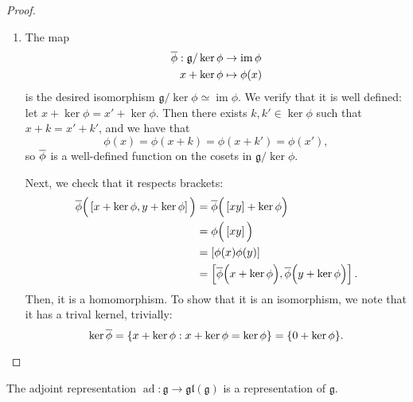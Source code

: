 \documentclass{article}
\newcommand{\lb}[1]{\ensuremath{\left[{#1}\right]}}
\DeclareMathOperator{\im}{im}
\DeclareMathOperator{\ad}{ad}
\newcommand{\frkg}{\ensuremath{\mathfrak{g}}}
\newcommand{\glalg}{\ensuremath{\mathfrak{gl}}}
\begin{document}
\begin{proof}
    \begin{enumerate}[label=(\alph*)]
        \item 
            The map
            \begin{align*}
                \barphi:
                \frkg/\ker\phi
                &\to
                \im \phi
                \\
                x + \ker \phi
                &\mapsto
                \phi(x)
            \end{align*}
            is the desired isomorphism $\frkg / \ker \phi \simeq \im \phi$.
            We verify that it is well defined: let $x + \ker \phi = x' + \ker \phi$.
            Then there exists $k, k' \in \ker \phi$ such that $x + k = x' + k'$, and we have that
            \[
                \phi(x)
                =
                \phi(x + k)
                =
                \phi(x + k')
                =
                \phi(x'),
            \]
            so $\overline{\phi}$ is a well-defined function on the cosets in $\frkg / \ker \phi$.

            Next, we check that it respects brackets:
            \begin{align*}
                \barphi
                \Big(
                    \lb{x+\ker\phi, y +\ker\phi}
                \Big)
                &=
                \barphi
                \Big(
                    \lb{xy} + \ker\phi
                \Big)
                \\
                &=
                \phi\Big(\lb{xy}\Big)
                \\
                &=
                \lb{\phi(x)\phi(y)}
                \\
                &=
                \lb{
                    \barphi\Big(x + \ker\phi\Big),
                    \barphi\Big(y + \ker\phi\Big)
                }.
            \end{align*}
            Then, it is a homomorphism.
            To show that it is an isomorphism, we note that it has a trival kernel, trivially:
            \[
                \ker\overline{\phi}
                =
                \{x + \ker \phi : x + \ker\phi = \ker \phi\}
                =
                \{0 + \ker \phi\}.
            \]
    \end{enumerate}
\end{proof}

\begin{theorem}
    The adjoint representation $\ad: \frkg \to \glalg(\frkg)$ is a representation of $\frkg$.
\end{theorem}
\end{document}

